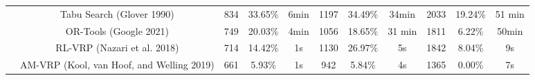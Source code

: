\documentclass{article}
\begin{document}
\begin{table}
\begin{tabular}{cc|ccc|ccc|ccc}
                                  & Tabu Search (Glover 1990)                    & 834                       & 33.65\%                    & 6min & 1197  & 34.49\% & 34min  & 2033   & 19.24\% & 51 min \\
                                  & OR-Tools (Google 2021)                       & 749                       & 20.03\%                    & 4min & 1056  & 18.65\% & 31 min & 1811   & 6.22\%  & 50min  \\
                                  & RL-VRP (Nazari et al. 2018)                  & 714                       & 14.42\%                    & 1s   & 1130  & 26.97\% & 5s     & 1842   & 8.04\%  & 9s     \\
                                  & AM-VRP (Kool, van Hoof, and Welling 2019)    & 661                       & 5.93\%                     & 1s   & 942   & 5.84\%  & 4s     & 1365   & 0.00\%  & 7s     \\
    \end{tabular}
\end{table}
\end{document}
